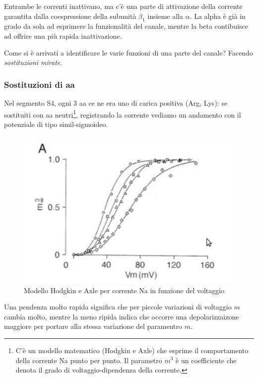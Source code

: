 \documentclass[a4paper,12pt]{article}
\begin{document}
Entrambe le correnti inattivano, ma c'è una parte di attivazione della corrente garantita dalla coespressione della subunità $\beta_{1}$ insieme alla $\alpha$. La alpha è già in grado da sola ad esprimere la funzionalità del canale, mentre la beta contibuisce ad offrire una più rapida inattivazione.

Come si è arrivati a identificare le varie funzioni di una parte del canale? Facendo \emph{sostituzioni mirate}.\subsubsection{Sostituzioni di aa}
Nel segmento S4, ogni 3 aa ce ne era uno di carica positiva (Arg, Lys): se sostituiti con aa neutri\footnote{C'è un modello matematico (Hodgkin e Axle) che esprime il comportamento della corrente Na punto per punto. Il parametro $m^{3 }$ è un coefficiente che denota il grado di voltaggio-dipendenza della corrente.}, registrando la corrente vediamo un andamento con il potenziale di tipo simil-sigmoideo. 

\begin{figure}[H]
\centering
\includegraphics[scale=0.4]{immagine/axle.jpg}
\caption{Modello Hodgkin e Axle per corrente Na in funzione del voltaggio}
\end{figure} 

Una pendenza molto rapida significa che per piccole variazioni di voltaggio $m$ cambia molto, mentre la meno ripida indica che occorre una depolarizzaizone maggiore per portare alla stessa variazione del paramentro $m$.
\end{document}
